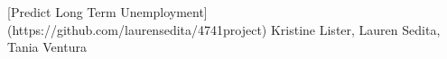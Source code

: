 [Predict Long Term Unemployment](https://github.com/laurensedita/4741project) Kristine Lister, Lauren Sedita, Tania Ventura
